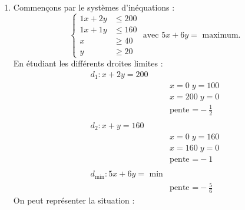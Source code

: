 \documentclass[12pt, addpoints]{exam}
\begin{document}
\begin{questions}
\begin{solution}
\begin{enumerate}[1.]
On a ainsi : mode $=29$ et $31$, médiane $=31$, moyenne $=31.12$.

Le pourcentage recherché est dans l'intervalle $[31.12-1.796;31.12+1.796] = [29.324;32,916]$, c'est-à-dire entre $30$ et $32$ compris : $\frac{11}{25}=44\%$

\newpage

    \item 
            Commençons par le systèmes d'inéquations :
            $$
            \left\{
            \begin{array}{rl}
                1x+2y & \leq 200  \\
                1x+1y & \leq 160\\
                x & \geq 40\\
                y & \geq 20
            \end{array}
            \right.
            \mbox{ avec }
            5x+6y=\mbox{ maximum}.
            $$
            En étudiant les différents droites limites :
            \begin{align*}
            d_1 : x+2y=200 & \\
            &x=0 \; y= 100\\
            &x=200 \; y=0\\
            &\mbox{pente =}-\frac{1}{2}\\
            &\\
            d_2 : x+y=160 & \\
            &x=0 \; y= 160\\
            &x=160 \;y=0\\
            &\mbox{pente =}-1\\
            &\\
            d_{\mbox{min}} : 5x+6y=\mbox{ min} & \\
            &\mbox{pente =}-\frac{5}{6}
            \end{align*}
            On peut représenter la situation :
            \begin{center}
\end{center}
\end{enumerate}
\end{solution}
\end{questions}
\end{document}
